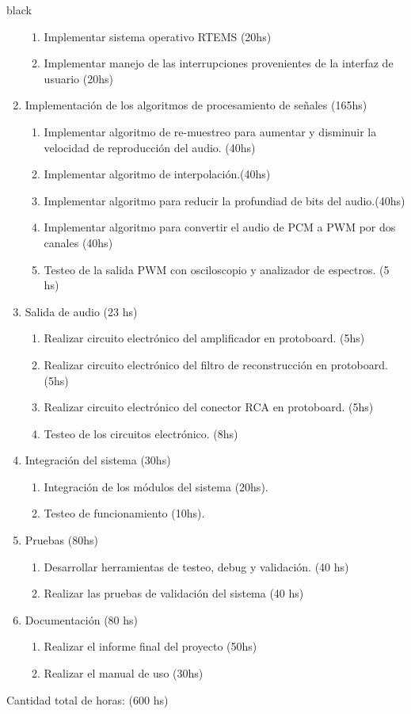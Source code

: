 \documentclass[11pt]{charter}
\begin{document}
\begin{consigna}{black}
\begin{enumerate}
	\begin{enumerate}
	\item Implementar sistema operativo RTEMS (20hs)
	\item Implementar manejo de las interrupciones provenientes de la interfaz de usuario (20hs) 
	\end{enumerate}
\item Implementación de los algoritmos de procesamiento de señales (165hs)
	\begin{enumerate}
	\item Implementar algoritmo de re-muestreo para aumentar y disminuir la velocidad de reproducción del audio. (40hs)
	\item Implementar algoritmo de interpolación.(40hs)
	\item Implementar algoritmo para reducir la profundiad de bits del audio.(40hs)
	\item Implementar algoritmo para convertir el audio de PCM a PWM por dos canales (40hs)
	\item Testeo de la salida PWM con osciloscopio y analizador de espectros. (5 hs)
	\end{enumerate}
\item Salida de audio (23 hs)
	\begin{enumerate}	
	\item Realizar circuito electrónico del amplificador en protoboard. (5hs)
	\item Realizar circuito electrónico del filtro de reconstrucción en protoboard. (5hs)
	\item Realizar circuito electrónico del conector RCA en protoboard. (5hs)
	\item Testeo de los circuitos electrónico. (8hs)
	\end{enumerate}
\item Integración del sistema (30hs)
	\begin{enumerate}
	\item Integración de los módulos del sistema (20hs).
	\item Testeo de funcionamiento (10hs).
	\end{enumerate}
\item Pruebas (80hs)
	\begin{enumerate}
	\item Desarrollar herramientas de testeo, debug y validación. (40 hs)
	\item Realizar las pruebas de validación del sistema (40 hs)
	\end{enumerate}
\item Documentación (80 hs)
	\begin{enumerate}
	\item Realizar el informe final del proyecto (50hs)
	\item Realizar el manual de uso (30hs)
	\end{enumerate}
\end{enumerate}

Cantidad total de horas: (600 hs)

\end{consigna}
\end{document}
